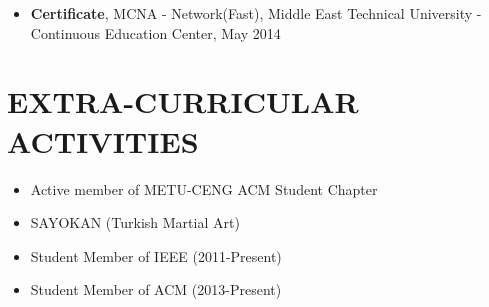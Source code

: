\documentclass[margin, 10pt]{res} %
\begin{document}
\begin{resume}
\begin{itemize}
\item {\bf Certificate}, MCNA - Network(Fast), Middle East Technical University - Continuous Education Center, May 2014
\end{itemize}



\section{EXTRA-CURRICULAR \\ ACTIVITIES}

\begin{itemize} \itemsep -2pt %
\item Active member of METU-CENG ACM Student Chapter
\item SAYOKAN (Turkish Martial Art)
\item Student Member of IEEE (2011-Present)
\item Student Member of ACM (2013-Present)
\end{itemize}



































\end{resume}
\end{document}

